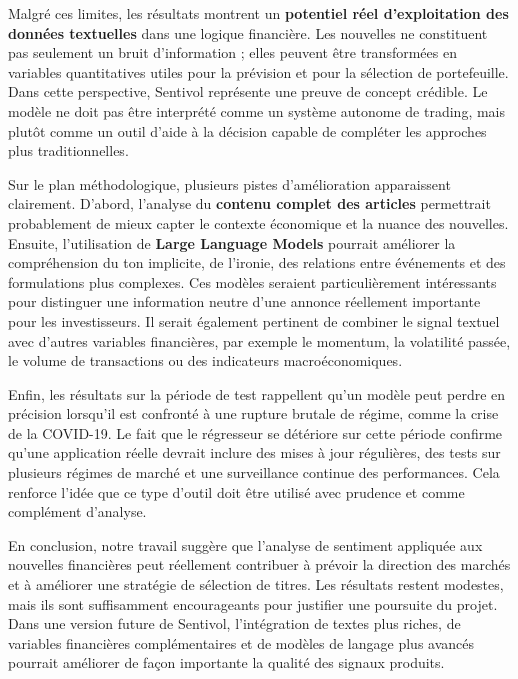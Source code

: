 \documentclass[11pt,a4paper]{article}
\begin{document}
Malgré ces limites, les résultats montrent un \textbf{potentiel réel d'exploitation des données textuelles} dans une logique financière. Les nouvelles ne constituent pas seulement un bruit d'information ; elles peuvent être transformées en variables quantitatives utiles pour la prévision et pour la sélection de portefeuille. Dans cette perspective, Sentivol représente une preuve de concept crédible. Le modèle ne doit pas être interprété comme un système autonome de trading, mais plutôt comme un outil d'aide à la décision capable de compléter les approches plus traditionnelles.

Sur le plan méthodologique, plusieurs pistes d'amélioration apparaissent clairement. D'abord, l'analyse du \textbf{contenu complet des articles} permettrait probablement de mieux capter le contexte économique et la nuance des nouvelles. Ensuite, l'utilisation de \textbf{Large Language Models} pourrait améliorer la compréhension du ton implicite, de l'ironie, des relations entre événements et des formulations plus complexes. Ces modèles seraient particulièrement intéressants pour distinguer une information neutre d'une annonce réellement importante pour les investisseurs. Il serait également pertinent de combiner le signal textuel avec d'autres variables financières, par exemple le momentum, la volatilité passée, le volume de transactions ou des indicateurs macroéconomiques.

Enfin, les résultats sur la période de test rappellent qu'un modèle peut perdre en précision lorsqu'il est confronté à une rupture brutale de régime, comme la crise de la COVID-19. Le fait que le régresseur se détériore sur cette période confirme qu'une application réelle devrait inclure des mises à jour régulières, des tests sur plusieurs régimes de marché et une surveillance continue des performances. Cela renforce l'idée que ce type d'outil doit être utilisé avec prudence et comme complément d'analyse.

En conclusion, notre travail suggère que l'analyse de sentiment appliquée aux nouvelles financières peut réellement contribuer à prévoir la direction des marchés et à améliorer une stratégie de sélection de titres. Les résultats restent modestes, mais ils sont suffisamment encourageants pour justifier une poursuite du projet. Dans une version future de Sentivol, l'intégration de textes plus riches, de variables financières complémentaires et de modèles de langage plus avancés pourrait améliorer de façon importante la qualité des signaux produits.
\end{document}
